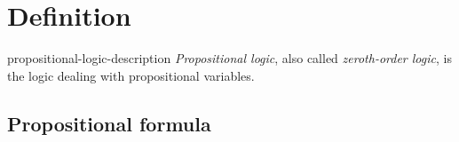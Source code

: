 \documentclass[preview]{standalone}
\begin{document}
\genpage

\section{Definition}

\begin{snippet}{propositional-logic-description}
\textit{Propositional logic}, also called \textit{zeroth-order logic},
is the logic dealing with propositional variables.
\end{snippet}


\subsection{Propositional formula}

\end{document}
